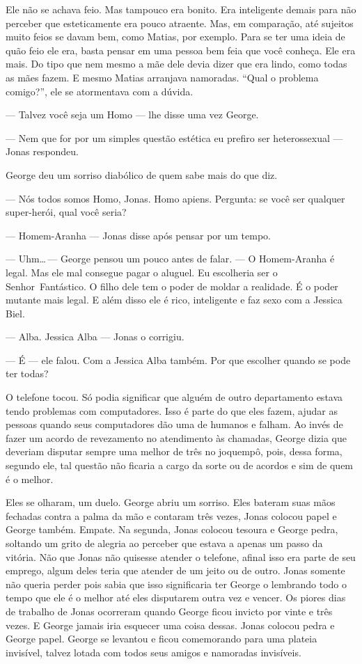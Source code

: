 Ele não se achava feio. Mas tampouco era bonito. Era inteligente demais para não perceber que esteticamente era pouco atraente. Mas, em comparação, até sujeitos muito feios se davam bem, como Matias, por exemplo. Para se ter uma ideia de quão feio ele era, basta pensar em uma pessoa bem feia que você conheça. Ele era mais. Do tipo que nem mesmo a mãe dele devia dizer que era lindo, como todas as mães fazem. E mesmo Matias arranjava namoradas. ``Qual o problema comigo?'', ele se atormentava com a dúvida.

--- Talvez você seja um Homo --- lhe disse uma vez George.

--- Nem que for por um simples questão estética\mudanca{,} eu prefiro ser heterossexual --- Jonas respondeu.

George deu um sorriso diabólico de quem sabe mais do que diz.

--- Nós todos somos Homo, Jonas. Homo apiens. Pergunta: se você  ser qualquer super-herói, qual você seria?

--- Homem-Aranha --- Jonas disse após pensar por um tempo.

--- Uhm\ldots\,--- George pensou um pouco antes de falar. --- O Homem-Aranha é legal. Mas ele mal consegue pagar o aluguel. Eu escolheria ser o Senhor~Fantástico. O filho dele tem o poder de moldar a realidade. É o poder mutante mais legal. E além disso ele é rico, inteligente e faz sexo com a Jessica Biel.

--- Alba. Jessica Alba --- Jonas o corrigiu.

--- É --- ele falou. Com a Jessica Alba também. Por que escolher quando se pode ter todas?

O telefone tocou. Só podia significar que alguém de outro departamento estava tendo problemas com computadores. Isso é parte do que eles fazem, ajudar as pessoas quando seus computadores dão uma de humanos e falham. Ao invés de fazer um acordo de revezamento no atendimento às chamadas, George dizia que deveriam disputar sempre uma melhor de três no joquempô, pois, dessa forma, segundo ele, tal questão não ficaria a cargo da sorte ou de acordos e sim de quem é o melhor.

Eles se olharam,  um duelo. George abriu um sorriso. Eles bateram suas mãos fechadas contra a palma da mão e contaram três vezes, Jonas colocou papel e George também. Empate. Na segunda, Jonas colocou tesoura e George pedra, soltando um grito de alegria ao perceber que estava a apenas um passo da vitória. Não que Jonas não quisesse atender o telefone, afinal isso era parte de seu emprego, algum deles teria que atender de um jeito ou de outro. Jonas somente não queria perder pois sabia que isso significaria ter George o lembrando todo o tempo que ele é o melhor até eles disputarem outra vez e vencer. Os piores dias de trabalho de Jonas ocorreram quando George ficou invicto por vinte e três vezes. E George jamais iria esquecer uma coisa dessas. Jonas colocou pedra e George papel. George se levantou e ficou comemorando para uma plateia invisível, talvez lotada com todos seus amigos e namoradas invisíveis.

